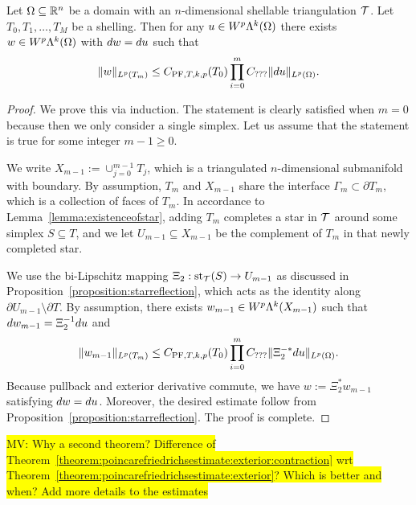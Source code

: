 \documentclass[10pt,a4paper]{article}
\newcommand{\todo}[1]{{\colorbox{yellow}{#1}}}
\begin{document}
\begin{theorem}\label{theorem:poincarefriedrichsestimate:exterior:contraction}
    Let $\Omega \subseteq {\mathbb R}^{n}$ be a domain with an $n$-dimensional shellable triangulation ${\mathcal T}$.
    Let $T_0, T_1, \dots, T_M$ be a shelling.
    Then for any $u \in W^{p}\Lambda^{k}(\Omega)$ 
    there exists $w \in W^{p}\Lambda^{k}(\Omega)$ with $d w = d u$ 
    such that 
    \begin{align*}
        \| w \|_{L^{p}(T_{m})}
        \leq 
        C_{{\rm PF},T,k,p}(T_{0})
        \prod_{i=0}^{m} 
        C_{???}
        \| d u \|_{L^{p}(\Omega)}
        .
    \end{align*}
\end{theorem}
\begin{proof}
    We prove this via induction. 
    The statement is clearly satisfied when $m=0$ because then we only consider a single simplex. 
    Let us assume that the statement is true for some integer $m-1 \geq 0$.
    
    We write $X_{m-1} := \cup_{j=0}^{m-1} T_{j}$, 
    which is a triangulated $n$-dimensional submanifold with boundary.
    By assumption, $T_{m}$ and $X_{m-1}$ share the interface $\Gamma_{m} \subset \partial T_{m}$, 
    which is a collection of faces of $T_{m}$. 
    In accordance to Lemma~\ref{lemma:existenceofstar}, adding $T_{m}$ completes a star in ${\mathcal T}$ around some simplex $S \subseteq T$, 
    and we let $U_{m-1} \subseteq X_{m-1}$ be the complement of $T_{m}$ in that newly completed star. 
    
    We use the bi-Lipschitz mapping $\Xi_{2} : \operatorname{st}_{{\mathcal T}}(S) \rightarrow U_{m-1}$ as discussed in Proposition~\ref{proposition:starreflection},
    which acts as the identity along $\partial U_{m-1} \setminus \partial T$.
    By assumption, 
    there exists $w_{m-1} \in W^{p}\Lambda^{k}(X_{m-1})$ 
    such that $d w_{m-1} = \Xi_{2}^{-1} d u$ and 
    \begin{align*}
        \| w_{m-1} \|_{L^{p}(T_{m})}
        \leq 
        C_{{\rm PF},T,k,p}(T_{0})
        \prod_{i=0}^{m} 
        C_{???}
        \| \Xi_{2}^{-\ast} d u \|_{L^{p}(\Omega)}
        .
    \end{align*}
    Because pullback and exterior derivative commute, 
    we have $w := \Xi_{2}^{\ast} w_{m-1}$ satisfying $d w = d u$. 
    Moreover, the desired estimate follow from Proposition~\ref{proposition:starreflection}.
    The proof is complete. 
\end{proof}
\todo{MV: Why a second theorem? Difference of Theorem~\ref{theorem:poincarefriedrichsestimate:exterior:contraction} wrt Theorem~\ref{theorem:poincarefriedrichsestimate:exterior}? Which is better and when? Add more details to the estimates}
\end{document}
